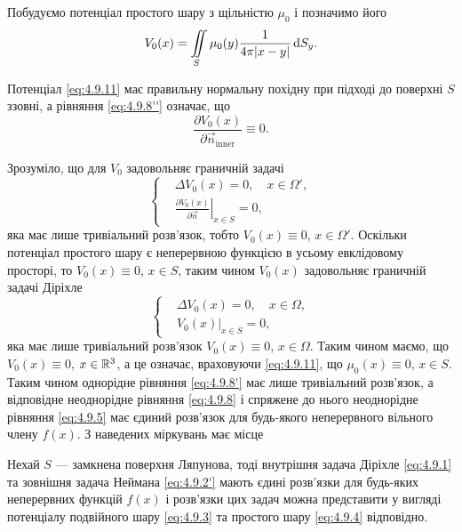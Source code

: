 Побудуємо потенціал простого шару з щільністю $\mu_0$ і позначимо його
\begin{equation}
	\label{eq:4.9.11}	
	V_0(x) = \displaystyle\iint\limits_S \mu_0(y) \frac{1}{4 \pi |x - y|} \mathop{}\!\mathrm{d} S_y.
\end{equation}

Потенціал \eqref{eq:4.9.11} має правильну нормальну похідну при підході до поверхні $S$ ззовні, а рівняння \eqref{eq:4.9.8''} означає, що
\begin{equation}
	\label{eq:4.9.12}
	\frac{\partial V_0(x)}{\partial \vec n_{\text{inner}}} \equiv 0.
\end{equation}

Зрозуміло, що для $V_0$ задовольняє граничній задачі
\begin{equation}
	\label{eq:4.9.13}
	\left\{
		\begin{aligned}
			& \Delta V_0(x) = 0, \quad x \in \Omega', \\
			& \left. \frac{\partial V_0(x)}{\partial \vec n} \right|_{x \in S} = 0,
		\end{aligned}
	\right.
\end{equation}
яка має лише тривіальний розв'язок, тобто $V_0(x) \equiv 0$, $x \in \Omega'$. Оскільки потенціал простого шару є неперервною функцією в усьому евклідовому просторі, то $V_0(x) \equiv 0$, $x \in S$, таким чином $V_0(x)$ задовольняє граничній задачі Діріхле
\begin{equation}
	\left\{
		\begin{aligned}
			& \Delta V_0(x) = 0, \quad x \in \Omega, \\
			& \left .V_0(x) \right|_{x \in S} = 0,
		\end{aligned}
	\right.
\end{equation}
яка має лише тривіальний розв'язок $V_0(x) \equiv 0$, $x \in \Omega$. Таким чином маємо, що $V_0(x) \equiv 0$, $x \in \mathbb{R}^3$, а це означає, враховуючи \eqref{eq:4.9.11}, що $\mu_0(x) \equiv 0$, $x \in S$. Таким чином однорідне рівняння \eqref{eq:4.9.8'} має лише тривіальний розв'язок, а відповідне неоднорідне рівняння \eqref{eq:4.9.8} і спряжене до нього неоднорідне рівняння \eqref{eq:4.9.5} має єдиний розв'язок для будь-якого неперервного вільного члену $f(x)$. З наведених міркувань має місце 

\begin{theorem}
	Нехай $S$ --- замкнена поверхня Ляпунова, тоді внутрішня задача Діріхле \eqref{eq:4.9.1} та зовнішня задача Неймана \eqref{eq:4.9.2'} мають єдині розв'язки для будь-яких неперервних функцій $f(x)$ і розв'язки цих задач можна представити у вигляді потенціалу подвійного шару \eqref{eq:4.9.3} та простого шару \eqref{eq:4.9.4} відповідно.
\end{theorem}

